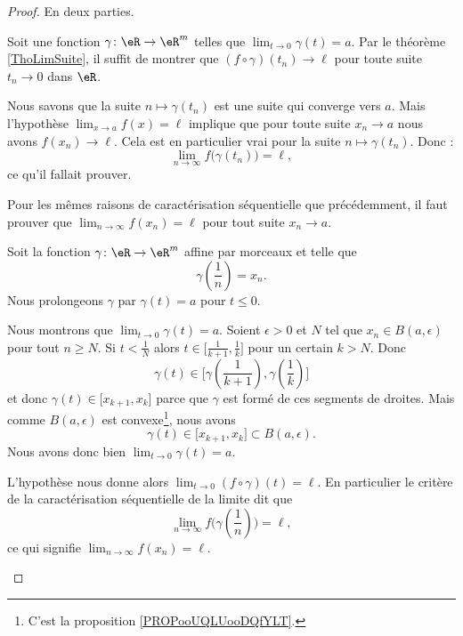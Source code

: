 \begin{proof}
	En deux parties.
	\begin{subproof}
		Soit une fonction \( \gamma\colon \eR\to \eR^m\) telles que \( \lim_{t\to 0} \gamma(t)=a\). Par le théorème \ref{ThoLimSuite}, il suffit de montrer que \( (f\circ\gamma)(t_n)\to\ell\) pour toute suite \( t_n\to 0\) dans \( \eR\).

		Nous savons que la suite \( n\mapsto \gamma(t_n)\) est une suite qui converge vers \( a\). Mais l'hypothèse \( \lim_{x\to a} f(x)=\ell\) implique que pour toute suite \( x_n\to a\) nous avons \( f(x_n)\to \ell\). Cela est en particulier vrai pour la suite \( n\mapsto \gamma(t_n)\). Donc :
		\begin{equation}
			\lim_{n\to \infty} f\big( \gamma(t_n) \big)=\ell,
		\end{equation}
		ce qu'il fallait prouver.

		\spitem[Réciproque]
		Pour les mêmes raisons de caractérisation séquentielle que précédemment, il faut prouver que \( \lim_{n\to \infty} f(x_n)=\ell\) pour tout suite \( x_n\to a\).

		\begin{subproof}
			\spitem[Un chemin]
			Soit la fonction \( \gamma\colon \eR\to \eR^m\) affine par morceaux et telle que
			\begin{equation}
				\gamma\left( \frac{1}{ n } \right)=x_n.
			\end{equation}
			Nous prolongeons \( \gamma\) par \( \gamma(t)=a\) pour \( t\leq 0\).

			\spitem[\( \gamma(t)\to a\)]
			Nous montrons que \( \lim_{t\to 0} \gamma(t)=a\). Soient \( \epsilon>0\) et \( N\) tel que \( x_n\in B(a,\epsilon)\) pour tout \( n\geq N\). Si \( t<\frac{1}{ N }\) alors \( t\in\mathopen[ \frac{1}{ k+1 } , \frac{1}{ k } \mathclose]\) pour un certain \( k>N\). Donc
			\begin{equation}
				\gamma(t)\in\mathopen[ \gamma(\frac{1}{ k+1 }) , \gamma(\frac{1}{ k }) \mathclose]
			\end{equation}
			et donc \( \gamma(t)\in\mathopen[ x_{k+1} , x_k \mathclose]\) parce que \( \gamma\) est formé de ces segments de droites. Mais comme \( B(a,\epsilon)\) est convexe\footnote{C'est la proposition \ref{PROPooUQLUooDQfYLT}.}, nous avons
			\begin{equation}
				\gamma(t)\in\mathopen[ x_{k+1} , x_k \mathclose]\subset B(a,\epsilon).
			\end{equation}
			Nous avons donc bien \( \lim_{t\to 0} \gamma(t)=a\).

			\spitem[Conclusion]
			L'hypothèse nous donne alors \( \lim_{t\to 0} (f\circ \gamma)(t)=\ell\). En particulier le critère de la caractérisation séquentielle de la limite dit que
			\begin{equation}
				\lim_{n\to \infty} f\big( \gamma(\frac{1}{ n }) \big)=\ell,
			\end{equation}
			ce qui signifie \( \lim_{n\to \infty} f(x_n)=\ell\).
		\end{subproof}
	\end{subproof}
\end{proof}

